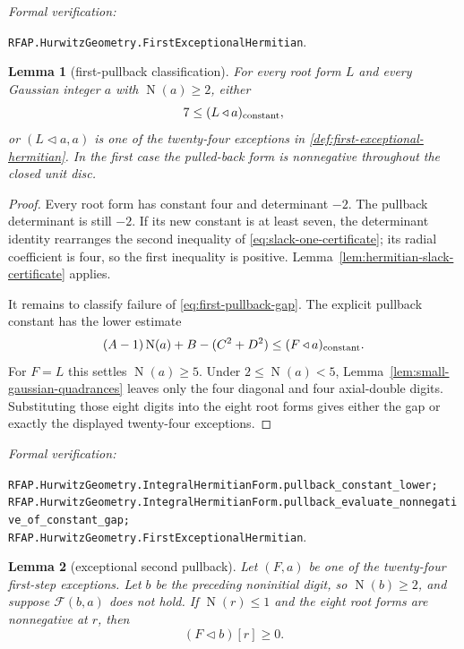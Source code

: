 \documentclass[11pt]{article}
\newtheorem{lemma}[lemma]{Lemma}
\newcommand{\Norm}[1]{\operatorname{N}\!\left(#1\right)}
\newcommand{\leanref}[1]{\par\smallskip\noindent
  \emph{Formal verification:}\par\nobreak
  {\raggedright\nolinkurl{#1}.\par}}
\begin{document}
\leanref{RFAP.HurwitzGeometry.FirstExceptionalHermitian}

\begin{lemma}[first-pullback classification]
\label{lem:first-pullback-classification}
For every root form $L$ and every Gaussian integer $a$ with
$\Norm a\ge2$, either
\begin{equation}
\label{eq:first-pullback-gap}
                 7\le (L\mathbin{\triangleleft}a)_{\rm constant},
\end{equation}
or $(L\mathbin{\triangleleft}a,a)$ is one of the twenty-four exceptions in
\cref{def:first-exceptional-hermitian}.  In the first case the pulled-back
form is nonnegative throughout the closed unit disc.
\end{lemma}

\begin{proof}
Every root form has constant four and determinant $-2$.  The pullback
determinant is still $-2$.  If its new constant is at least seven, the
determinant identity rearranges the second inequality of
\eqref{eq:slack-one-certificate}; its radial coefficient is four, so the
first inequality is positive.  Lemma~\ref{lem:hermitian-slack-certificate}
applies.

It remains to classify failure of \eqref{eq:first-pullback-gap}.  The
explicit pullback constant has the lower estimate
\[
 (A-1)\Norm a+B-(C^2+D^2)
       \le (F\mathbin{\triangleleft}a)_{\rm constant}.
\]
For $F=L$ this settles $\Norm a\ge5$.  Under
$2\le\Norm a<5$, Lemma~\ref{lem:small-gaussian-quadrances} leaves only the
four diagonal and four axial-double digits.  Substituting those eight digits
into the eight root forms gives either the gap or exactly the displayed
twenty-four exceptions.
\end{proof}

\leanref{RFAP.HurwitzGeometry.IntegralHermitianForm.pullback_constant_lower;
RFAP.HurwitzGeometry.IntegralHermitianForm.pullback_evaluate_nonnegative_of_constant_gap;
RFAP.HurwitzGeometry.FirstExceptionalHermitian}

\begin{lemma}[exceptional second pullback]
\label{lem:exceptional-second-pullback}
Let $(F,a)$ be one of the twenty-four first-step exceptions.  Let $b$ be the
preceding noninitial digit, so $\Norm b\ge2$, and suppose
$\mathcal F(b,a)$ does not hold.  If $\Norm r\le1$ and the eight root forms
are nonnegative at $r$, then
\begin{equation}
\label{eq:exceptional-second-pullback}
                       (F\mathbin{\triangleleft}b)[r]\ge0.
\end{equation}
\end{lemma}
\end{document}
